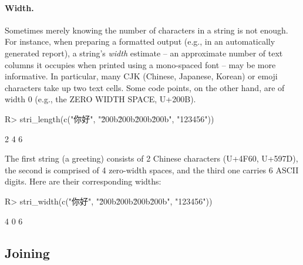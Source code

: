 \documentclass[nojss]{jss}
\begin{document}
\paragraph{Width.}
Sometimes merely knowing  the number of characters in a string is not enough.
For instance, when preparing a formatted output (e.g., in an automatically
generated report),
a string's \textit{width} estimate -- an approximate number of text columns
it occupies when printed using a mono-spaced font -- may be more informative.
In particular, many CJK (Chinese, Japanese, Korean) or emoji
characters take up two text cells. Some code points, on the other hand,
are of width 0 (e.g., the ZERO WIDTH SPACE, U+200B).



\begin{Schunk}
\begin{Sinput}
R> stri_length(c("你好", "\u200b\u200b\u200b\u200b", "123456"))
\end{Sinput}
\begin{Soutput}
[1] 2 4 6
\end{Soutput}
\end{Schunk}

\noindent
The first string (a greeting) consists of 2 Chinese characters (U+4F60, U+597D),
the second is comprised of 4 zero-width spaces, and the third one
carries 6 ASCII digits. Here are their corresponding widths:

\begin{Schunk}
\begin{Sinput}
R> stri_width(c("你好", "\u200b\u200b\u200b\u200b", "123456"))
\end{Sinput}
\begin{Soutput}
[1] 4 0 6
\end{Soutput}
\end{Schunk}












\subsection{Joining}
\end{document}
